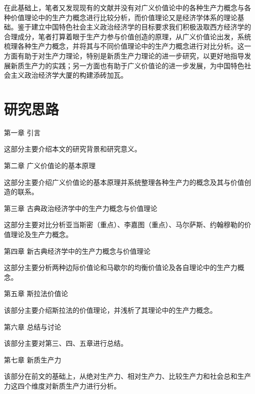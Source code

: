 在此基础上，笔者又发现现有的文献并没有对广义价值论中的各种生产力概念与各种价值理论中的生产力概念进行比较分析，而价值理论又是经济学体系的理论基础\cite[118]{CaiJiMingCongGuDianZhengZhiJingJiXueDaoZhongGuoTeSeSheHuiZhuYiZhengZhiJingJiXueJiYuZhongGuoShiJiaoDeZhengZhiJingJiXueYanBianShangCe2023}。鉴于建立中国特色社会主义政治经济学的目标要求我们积极汲取西方经济学的合理成分\cite[81]{ChengEnFuChongJianZhongGuoJingJiXueChaoYueMaKeSiYuXiFangJingJiXue2000}，笔者打算着眼于生产力参与价值创造的原理，从广义价值论出发，系统梳理各种生产力概念，并将其与不同价值理论中的生产力概念进行对比分析。这一方面有助于对生产力理论，特别是新质生产力理论的进一步研究，以更好地指导发展新质生产力的实践；另一方面也有助于广义价值论的进一步发展，为中国特色社会主义政治经济学大厦的构建添砖加瓦。


\section{研究思路}

第一章 \quad 引言

这部分主要介绍本文的研究背景和研究意义。

第二章 \quad 广义价值论的基本原理

这部分主要介绍广义价值论的基本原理并系统整理各种生产力的概念及其与价值创造的联系。

第三章 \quad 古典政治经济学中的生产力概念与价值理论

这部分主要对比分析亚当斯密（重点）、李嘉图（重点）、马尔萨斯、约翰穆勒的价值理论及生产力概念。

第四章 \quad 新古典经济学中的生产力概念与价值理论

这部分主要分析两种边际价值论和马歇尔的均衡价值论及各自理论中的生产力概念。

第五章 \quad 斯拉法价值论

该部分主要介绍斯拉法的价值理论，并浅析了其理论中的生产力概念。

第六章 \quad 总结与讨论

该部分主要对第三、四、五章进行总结。

第七章 \quad 新质生产力

该部分在前文的基础上，从绝对生产力、相对生产力、比较生产力和社会总和生产力这四个维度对新质生产力进行分析。


